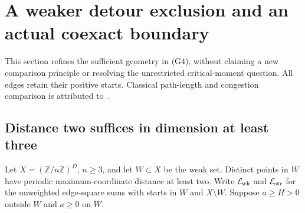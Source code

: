 \section{A weaker detour exclusion and an actual coexact boundary}
\label{sec:detour190}
This section refines the sufficient geometry in (G4), without claiming a
new comparison principle or resolving the unrestricted critical-moment
question. All edges retain their positive starts. Classical path-length
and congestion comparison is attributed to~\cite{geo:comparison}.

\subsection{Distance two suffices in dimension at least three}
Let $X=(\mathbb Z/n\mathbb Z)^D$, $n\ge3$, and let $W\subset X$ be the weak
set. Distinct points in $W$ have periodic maximum-coordinate distance at
least two. Write $\mathcal E_{\rm wk}$ and $\mathcal E_{\rm str}$ for the
unweighted edge-square sums with starts in $W$ and $X\setminus W$.
Suppose $a\ge H>0$ outside $W$ and $a\ge0$ on $W$.

